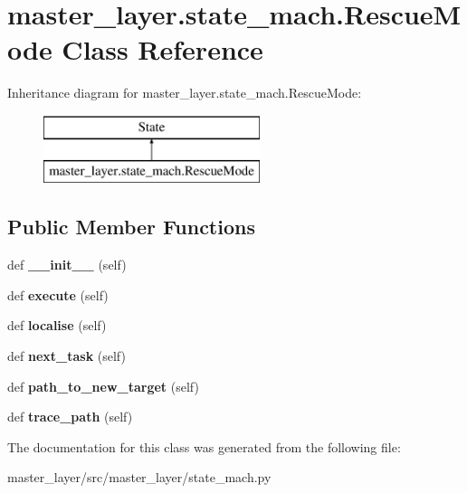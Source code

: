 \hypertarget{classmaster__layer_1_1state__mach_1_1RescueMode}{}\section{master\+\_\+layer.\+state\+\_\+mach.\+Rescue\+Mode Class Reference}
\label{classmaster__layer_1_1state__mach_1_1RescueMode}
Inheritance diagram for master\+\_\+layer.\+state\+\_\+mach.\+Rescue\+Mode\+:\begin{figure}[H]
\begin{center}
\leavevmode
\includegraphics[height=2.000000cm]{classmaster__layer_1_1state__mach_1_1RescueMode}
\end{center}
\end{figure}
\subsection*{Public Member Functions}
\begin{DoxyCompactItemize}
\item 
\mbox{\label{classmaster__layer_1_1state__mach_1_1RescueMode_ac5557671976bf6a9fb2d19e6bb3cd0b3}} 
def {\bfseries \+\_\+\+\_\+init\+\_\+\+\_\+} (self)
\item 
\mbox{\label{classmaster__layer_1_1state__mach_1_1RescueMode_a22f630ef39b445bb70ca06211872593b}} 
def {\bfseries execute} (self)
\item 
\mbox{\label{classmaster__layer_1_1state__mach_1_1RescueMode_a252bb72660134288dd419aff818b420e}} 
def {\bfseries localise} (self)
\item 
\mbox{\label{classmaster__layer_1_1state__mach_1_1RescueMode_a103b63c01d6259eb46ad453934e6a323}} 
def {\bfseries next\+\_\+task} (self)
\item 
\mbox{\label{classmaster__layer_1_1state__mach_1_1RescueMode_a13a8713dacfd45b25822779cd7502c52}} 
def {\bfseries path\+\_\+to\+\_\+new\+\_\+target} (self)
\item 
\mbox{\label{classmaster__layer_1_1state__mach_1_1RescueMode_a75fd1b0674eb113927bf198d1f5ad9a1}} 
def {\bfseries trace\+\_\+path} (self)
\end{DoxyCompactItemize}


The documentation for this class was generated from the following file\+:\begin{DoxyCompactItemize}
\item 
master\+\_\+layer/src/master\+\_\+layer/state\+\_\+mach.\+py\end{DoxyCompactItemize}
